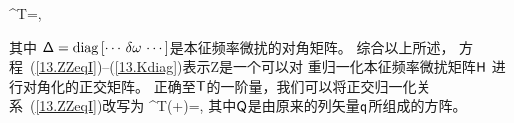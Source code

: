 {{\ssZ^{\rm T}\ssH\ssZ=\ssDelta,
\en

其中 $\mbox{${\sf \Delta}$}={\rm diag}\,[\cdots\,\delta\mbox{$\omega$}\,\cdots]$是本征频率微扰的对角矩阵。
综合以上所述，
方程~(\ref{13.ZZeqI})--(\ref{13.Kdiag})表示Z是一个可以对
重归一化本征频率微扰矩阵$\mbox{${\sf H}$}$
进行对角化的正交矩阵。
正确至$\mbox{${\sf T}$}$的一阶量，我们可以将正交归一化关系~(\ref{13.ZZeqI})改写为
\eq \label{13.QQeqI}
\ssQ^{\rm T}(\ssI+\ssT)\ssQ=\ssI,
\en
其中$\mbox{${\sf Q}$}$是由原来的列矢量$\mbox{${\sf q}$}$所组成的方阵。

}}
